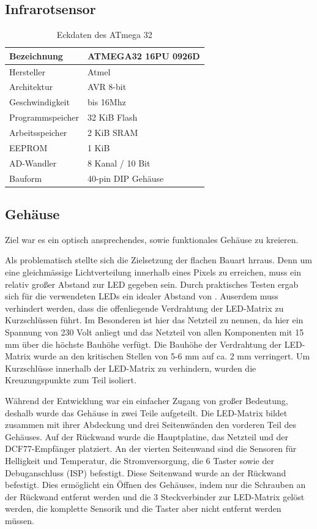 \subsection{Infrarotsensor}
\begin{table}[htp]
\centering
\renewcommand{\arraystretch}{1.2}
\begin{tabular}{||l|l||}
\hline \hline
Bezeichnung&ATMEGA32 16PU 0926D\\ \hline
Hersteller&Atmel\\ \hline
Architektur&AVR 8-bit\\ \hline
Geschwindigkeit&bis 16Mhz \\ \hline
Programmspeicher&32 KiB Flash \\ \hline
Arbeitsspeicher&2 KiB SRAM \\ \hline
EEPROM&1 KiB \\ \hline
AD-Wandler&8 Kanal / 10 Bit \\ \hline
Bauform&40-pin DIP Gehäuse\\
\hline\hline
\end{tabular}
\caption{Eckdaten des ATmega 32}
\end{table}

\subsection{Gehäuse}
%
Ziel war es ein optisch ansprechendes, sowie funktionales Gehäuse zu kreieren. 

Als problematisch stellte sich die Zielsetzung der flachen Bauart hrraus. Denn um eine gleichmässige Lichtverteilung innerhalb eines Pixels zu erreichen, muss ein relativ großer Abstand zur LED gegeben sein. Durch praktisches Testen ergab sich für die verwendeten LEDs ein idealer Abstand von .%
Auserdem muss verhindert werden, dass die offenliegende Verdrahtung der LED-Matrix zu Kurzschlüssen führt. Im Besonderen ist hier das Netzteil zu nennen, da hier ein Spannung von 230 Volt anliegt und das Netzteil von allen Komponenten mit 15 mm %
über die höchste Bauhöhe verfügt. 
Die Bauhöhe der Verdrahtung der LED-Matrix wurde an den kritischen Stellen von 5-6 mm auf ca. 2 mm verringert. Um Kurzschlüsse innerhalb der LED-Matrix zu verhindern, wurden die Kreuzungspunkte zum Teil isoliert.

Während der Entwicklung war ein einfacher Zugang von großer Bedeutung, deshalb wurde das Gehäuse in zwei Teile aufgeteilt. Die LED-Matrix bildet zusammen mit ihrer Abdeckung und drei Seitenwänden den vorderen Teil des Gehäuses. Auf der Rückwand wurde die Hauptplatine, das Netzteil und der DCF77-Empfänger platziert. An der vierten Seitenwand sind die Sensoren für Helligkeit und Temperatur, die Stromversorgung, die 6 Taster sowie der Debuganschluss (ISP) %
befestigt. Diese Seitenwand wurde an der Rückwand befestigt. Dies ermöglicht ein Öffnen des Gehäuses, indem nur die Schrauben an der Rückwand entfernt werden und die 3 Steckverbinder zur LED-Matrix gelöst werden, die komplette Sensorik und die Taster aber nicht entfernt werden müssen.

